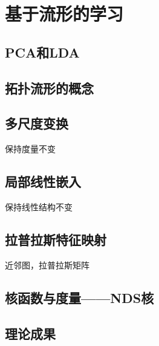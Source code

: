 \chapter{基于流形的学习}

\section{PCA和LDA}

\section{拓扑流形的概念}

\section{多尺度变换}

保持度量不变

\section{局部线性嵌入}

保持线性结构不变

\section{拉普拉斯特征映射}

近邻图，拉普拉斯矩阵

\section{核函数与度量——NDS核}

\section{理论成果}